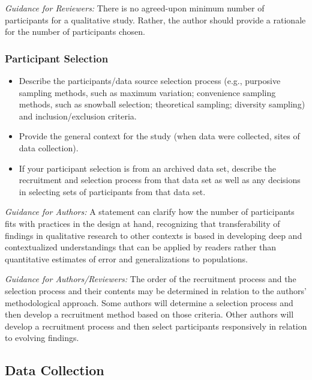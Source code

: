 \documentclass[acmsmall]{acmart}
\begin{document}
\textit{Guidance for Reviewers:} There is no agreed-upon minimum number of participants for a qualitative study. Rather, the author should provide a rationale for the number of participants chosen.

\subsubsection{Participant Selection}
\begin{itemize}
    \item Describe the participants/data source selection process (e.g., purposive sampling methods,
such as maximum variation; convenience sampling methods, such as snowball selection; theoretical sampling; diversity sampling) and inclusion/exclusion criteria.
\item  Provide the general context for the study (when data were collected, sites of data collection).
\item  If your participant selection is from an archived data set, describe the recruitment and selection process from that data set as well as any decisions in selecting sets of participants from that data set.
\end{itemize}


\textit{Guidance for Authors:} A statement can clarify how the number of participants fits with practices in the design at hand, recognizing that transferability of findings in qualitative research to other contexts
is based in developing deep and contextualized understandings that can be applied by readers rather than quantitative estimates of error and generalizations to populations.
\vspace{3mm}

\textit{Guidance for Authors/Reviewers:} The order of the recruitment process and the selection process and their contents may be determined in relation to the authors’ methodological approach. Some authors will determine a selection process and then develop a recruitment method based on those criteria. Other authors will develop a recruitment process and then select participants
responsively in relation to evolving findings.


\subsection{Data Collection}
\end{document}
